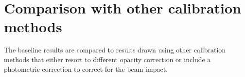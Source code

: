 

\section{Comparison with other calibration methods}
\label{se:photometry_others}

The baseline results are compared to
results drawn using other calibration methods that either resort to different
opacity correction or include a photometric correction to correct for
the beam impact.
